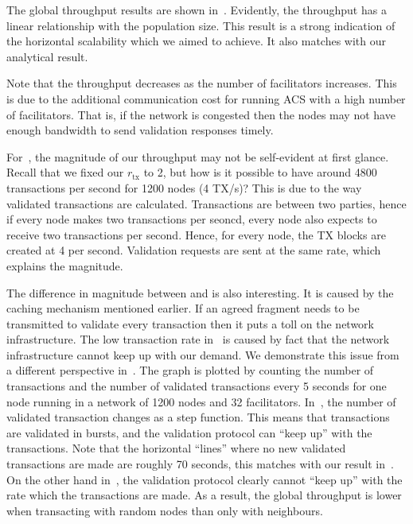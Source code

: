 The global throughput results are shown in~.
Evidently, the throughput has a linear relationship with the population size.
This result is a strong indication of the horizontal scalability which we aimed to achieve.
It also matches with our analytical result.

Note that the throughput decreases as the number of facilitators increases.
This is due to the additional communication cost for running ACS with a high number of facilitators.
That is, if the network is congested then the nodes may not have enough bandwidth to send validation responses timely.

For~,
the magnitude of our throughput may not be self-evident at first glance.
Recall that we fixed our $r_\text{tx}$ to 2, but how is it possible to have around 4800 transactions per second for 1200 nodes (4 TX/s)?
This is due to the way validated transactions are calculated.
Transactions are between two parties, hence if every node makes two transactions per seoncd,
every node also expects to receive two transactions per second.
Hence, for every node, the TX blocks are created at 4 per second.
Validation requests are sent at the same rate, which explains the magnitude.

The difference in magnitude between  and  is also interesting.
It is caused by the caching mechanism mentioned earlier.
If an agreed fragment needs to be transmitted to validate every transaction then it puts a toll on the network infrastructure.
The low transaction rate in~ is caused by fact that the network infrastructure cannot keep up with our demand.
We demonstrate this issue from a different perspective in~.
The graph is plotted by counting the number of transactions and the number of validated transactions every 5 seconds for one node running in a network of 1200 nodes and 32 facilitators.
In~, the number of validated transaction changes as a step function.
This means that transactions are validated in bursts, and the validation protocol can ``keep up'' with the transactions.
Note that the horizontal ``lines'' where no new validated transactions are made are roughly 70 seconds, this matches with our result in~.
On the other hand in~, the validation protocol clearly cannot ``keep up'' with the rate which the transactions are made.
As a result, the global throughput is lower when transacting with random nodes than only with neighbours.


